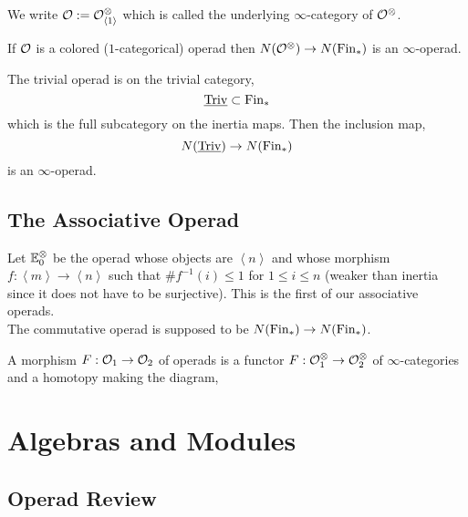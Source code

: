 \documentclass[12pt]{article}
\begin{document}
\begin{rmk}
We write $\mathcal{O} := \mathcal{O}^{\otimes}_{\left< 1 \right>}$ which is called the underlying $\infty$-category of $\mathcal{O}^{\otimes}$. 
\end{rmk}

\begin{rmk}
If $\mathcal{O}$ is a colored ($1$-categorical) operad then $N(\mathcal{O}^{\otimes}) \to N(\mathrm{Fin}_*)$ is an $\infty$-operad. 
\end{rmk}

\begin{example}
The trivial operad is on the trivial category,
\[ \underline{\mathrm{Triv}} \subset \mathrm{Fin}_* \]
which is the full subcategory on the inertia maps. Then the inclusion map,
\[ N(\underline{\mathrm{Triv}}) \to N(\mathrm{Fin}_*) \]
is an $\infty$-operad. 
\end{example}

\subsection{The Associative Operad}

Let $\mathbb{E}_0^\otimes$ be the operad whose objects are $\left< n \right>$ and whose morphism $f : \left< m \right> \to \left< n \right>$ such that $\# f^{-1}(i) \le 1$ for $1 \le i \le n$ (weaker than inertia since it does not have to be surjective). This is the first of our associative operads. 
\bigskip\\
The commutative operad is supposed to be $N(\mathrm{Fin}_*) \to N(\mathrm{Fin}_*)$.

\begin{defn}
A morphism $F : \mathcal{O}_1 \to \mathcal{O}_2$ of operads is a functor $F : \mathcal{O}_1^\otimes \to \mathcal{O}_2^\otimes$ of $\infty$-categories and a homotopy making the diagram,
\begin{center}
\end{center}
\end{defn}

\section{Algebras and Modules}

\subsection{Operad Review}
\end{document}
